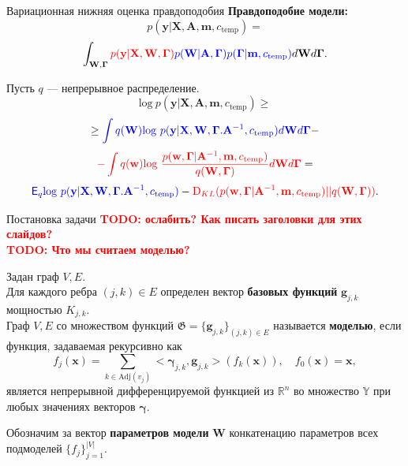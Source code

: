 \documentclass[usenames,dvipsnames,11pt,pdf,utf8,russian,aspectratio=169]{beamer}
\begin{document}
\begin{frame}{Вариационная нижняя оценка правдоподобия}     
\textbf{Правдоподобие модели:}
\[
p(\mathbf{y}|\mathbf{X},\mathbf{A},\mathbf{m}, c_{\text{temp}}) =
\]
\[
 \int_{\mathbf{W}, \boldsymbol{\Gamma} } \textcolor{red}{p(\mathbf{y}|\mathbf{X},\mathbf{W},  \boldsymbol{\Gamma})} \textcolor{blue}{p(\mathbf{W}|\mathbf{A}, \boldsymbol{\Gamma})p(\boldsymbol{\Gamma}|\mathbf{m}, c_{\text{temp}})} d\mathbf{W}d{\boldsymbol{\Gamma}}.                         
\]

Пусть $q$ --- непрерывное распределение.
$$                                                                                                                                              
        \text{log}~p(\mathbf{y}|\mathbf{X},\mathbf{A},\mathbf{m}, c_{\text{temp}}) \geq 
$$          
$$                                                                                                                                              
         \geq  \textcolor{blue}{\int q(\mathbf{W})\text{log}~{p(\mathbf{y} | \mathbf{X}, \mathbf{W}, \boldsymbol{\Gamma}. \mathbf{A}^{-1}, c_{\text{temp}})}d \mathbf{W}d\boldsymbol{\Gamma}} -$$ 
    $$  \textcolor{red}{-\int q(\mathbf{w})\text{log}~\frac{p(\mathbf{w}, \boldsymbol{\Gamma} |\mathbf{A}^{-1}, \mathbf{m}, c_{\text{temp}})}{q(\mathbf{W}, \boldsymbol{\Gamma})}d\mathbf{W}d\boldsymbol{\Gamma}} =$$
$$
\textcolor{blue}{\mathsf{E}_q \text{log}~{p(\mathbf{y} | \mathbf{X}, \mathbf{W}, \boldsymbol{\Gamma}. \mathbf{A}^{-1}, c_{\text{temp}})}} - \textcolor{red}{\text{D}_{KL}(p(\mathbf{w}, \boldsymbol{\Gamma} |\mathbf{A}^{-1}, \mathbf{m}, c_{\text{temp}}) || q(\mathbf{W}, \boldsymbol{\Gamma}))}.
$$ 

\end{frame}      
   


\begin{frame}{ Постановка задачи}
\textcolor{red}{\textbf{TODO: ослабить? Как писать заголовки для этих слайдов?\\}}
\textcolor{red}{\textbf{TODO: Что мы считаем моделью?\\}}

Задан граф $V,E$. \\
Для каждого ребра $(j,k) \in E$ определен вектор \textbf{базовых функций} $\mathbf{g}_{j,k}$ мощностью $K_{j,k}$.\\
Граф $V, E$ со множеством функций $\mathfrak{G} = \{\mathbf{g}_{j,k}\}_{(j,k) \in E}$ называется \textbf{моделью}, если функция, задаваемая рекурсивно как 
\[
    f_j(\mathbf{x}) = \sum_{k \in \text{Adj}(v_j)} <\boldsymbol{\gamma}_{j,k}, \mathbf{g}_{j,k}> (f_{k}(\mathbf{x})), \quad     f_0(\mathbf{x}) = \mathbf{x},
\]
является непрерывной дифференцируемой функцией из $\mathbb{R}^n$ во множество $\mathbb{Y}$ при любых значениях векторов $\boldsymbol{\gamma}$.

Обозначим за вектор \textbf{параметров модели}  $\mathbf{W}$ конкатенацию параметров всех подмоделей $\{f_j\}_{j=1}^{|V|}$.
\end{frame}
\end{document}
